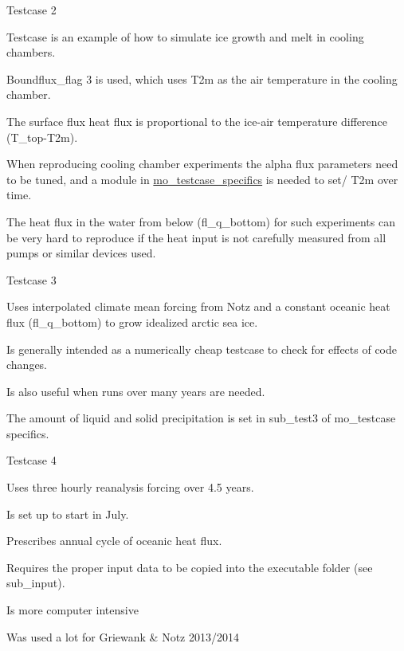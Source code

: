 Testcase 2
\begin{DoxyItemize}
\item Testcase is an example of how to simulate ice growth and melt in cooling chambers.
\item Boundflux\_\-flag 3 is used, which uses T2m as the air temperature in the cooling chamber.
\item The surface flux heat flux is proportional to the ice-\/air temperature difference (T\_\-top-\/T2m).
\item When reproducing cooling chamber experiments the alpha flux parameters need to be tuned, and a module in \hyperlink{namespacemo__testcase__specifics}{mo\_\-testcase\_\-specifics} is needed to set/ T2m over time.
\item The heat flux in the water from below (fl\_\-q\_\-bottom) for such experiments can be very hard to reproduce if the heat input is not carefully measured from all pumps or similar devices used.
\end{DoxyItemize}

Testcase 3
\begin{DoxyItemize}
\item Uses interpolated climate mean forcing from Notz and a constant oceanic heat flux (fl\_\-q\_\-bottom) to grow idealized arctic sea ice.
\item Is generally intended as a numerically cheap testcase to check for effects of code changes.
\item Is also useful when runs over many years are needed.
\item The amount of liquid and solid precipitation is set in sub\_\-test3 of mo\_\-testcase specifics.
\end{DoxyItemize}

Testcase 4
\begin{DoxyItemize}
\item Uses three hourly reanalysis forcing over 4.5 years.
\item Is set up to start in July.
\item Prescribes annual cycle of oceanic heat flux.
\item Requires the proper input data to be copied into the executable folder (see sub\_\-input).
\item Is more computer intensive
\item Was used a lot for Griewank \& Notz 2013/2014
\end{DoxyItemize}

